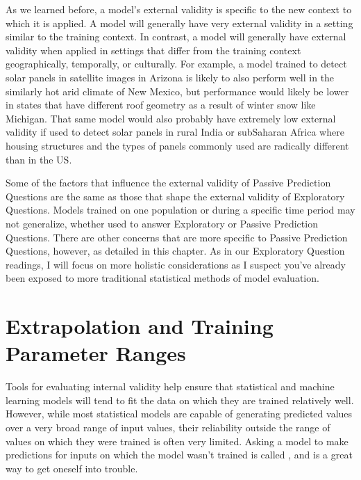\documentclass[letterpaper,10pt,english]{jupyterBook}
\begin{document}
\sphinxAtStartPar
As we learned before, a model’s external validity is specific to the new context to which it is applied. A model will generally have very  external validity in a setting similar to the training context. In contrast, a model will generally have  external validity when applied in settings that differ from the training context geographically, temporally, or culturally. For example, a model trained to detect solar panels in satellite images in Arizona is likely to also perform well in the similarly hot arid climate of New Mexico, but performance would likely be lower in states that have different roof geometry as a result of winter snow like Michigan. That same model would also probably have extremely low external validity if used to detect solar panels in rural India or sub\sphinxhyphen{}Saharan Africa where housing structures and the types of panels commonly used are radically different than in the US.

\sphinxAtStartPar
Some of the factors that influence the external validity of Passive Prediction Questions are the same as those that shape the external validity of Exploratory Questions. Models trained on one population or during a specific time period may not generalize, whether used to answer Exploratory or Passive Prediction Questions. There are other concerns that are more specific to Passive Prediction Questions, however, as detailed in this chapter. As in our Exploratory Question readings, I will focus on more holistic considerations as I suspect you’ve already been exposed to more traditional statistical methods of model evaluation.


\section{Extrapolation and Training Parameter Ranges}
\label{\detokenize{30_questions/27_passive_external_general:extrapolation-and-training-parameter-ranges}}
\sphinxAtStartPar
Tools for evaluating internal validity help ensure that statistical and machine learning models will tend to fit the data on which they are trained relatively well. However, while most statistical models are capable of generating predicted values over a very broad range of input values, their reliability outside the range of values on which they were trained is often very limited. Asking a model to make predictions for inputs on which the model wasn’t trained is called , and is a great way to get oneself into trouble.
\end{document}
